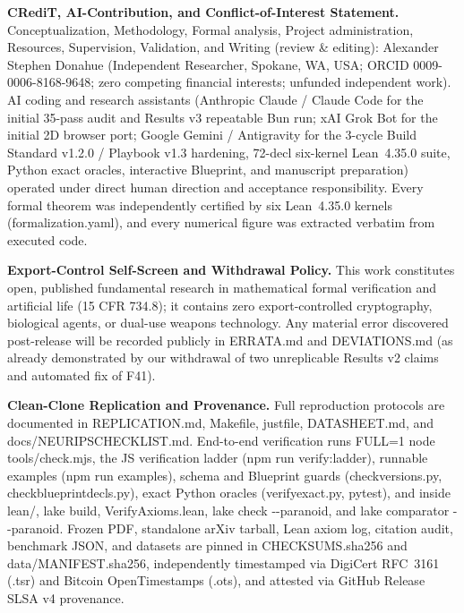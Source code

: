 \documentclass[11pt,a4paper]{article}
\numberwithin{equation}{section}
\theoremstyle{plain}
\theoremstyle{definition}
\theoremstyle{remark}
\newcommand{\code}[1]{{\ttfamily\footnotesize\def\_{\textunderscore\penalty0\hskip0pt}#1}}
\begin{document}
\textbf{CRediT, AI-Contribution, and Conflict-of-Interest Statement.} Conceptualization, Methodology, Formal analysis, Project administration, Resources, Supervision, Validation, and Writing (review \& editing): Alexander Stephen Donahue (Independent Researcher, Spokane, WA, USA; ORCID \code{0009-0006-8168-9648}; zero competing financial interests; unfunded independent work). AI coding and research assistants (Anthropic Claude / Claude Code for the initial 35-pass audit and \code{Results v3} repeatable Bun run; xAI Grok Bot for the initial 2D browser port; Google Gemini / Antigravity for the 3-cycle Build Standard \code{v1.2.0} / Playbook \code{v1.3} hardening, 72-decl six-kernel Lean~4.35.0 suite, Python exact oracles, interactive Blueprint, and manuscript preparation) operated under direct human direction and acceptance responsibility. Every formal theorem was independently certified by six Lean~4.35.0 kernels (\code{formalization.yaml}), and every numerical figure was extracted verbatim from executed code.

\textbf{Export-Control Self-Screen and Withdrawal Policy.} This work constitutes open, published fundamental research in mathematical formal verification and artificial life (\code{15 CFR 734.8}); it contains zero export-controlled cryptography, biological agents, or dual-use weapons technology. Any material error discovered post-release will be recorded publicly in \code{ERRATA.md} and \code{DEVIATIONS.md} (as already demonstrated by our withdrawal of two unreplicable \code{Results v2} claims and automated fix of \code{F41}).

\textbf{Clean-Clone Replication and Provenance.} Full reproduction protocols are documented in \code{REPLICATION.md}, \code{Makefile}, \code{justfile}, \code{DATASHEET.md}, and \code{docs/\allowbreak NEURIPS\_CHECKLIST.md}. End-to-end verification runs \code{FULL=1} \code{node} \code{tools/\allowbreak check.mjs}, the JS verification ladder (\code{npm} \code{run} \code{verify:\allowbreak ladder}), runnable examples (\code{npm} \code{run} \code{examples}), schema and Blueprint guards (\code{check\_versions.py}, \code{check\_blueprint\_decls.py}), exact Python oracles (\code{verify\_exact.py}, \code{pytest}), and inside \code{lean/}, \code{lake} \code{build}, \code{VerifyAxioms.\allowbreak lean}, \code{lake} \code{check} \code{{-}{-}paranoid}, and \code{lake} \code{comparator} \code{{-}{-}paranoid}. Frozen PDF, standalone arXiv tarball, Lean axiom log, citation audit, benchmark JSON, and datasets are pinned in \code{CHECKSUMS.\allowbreak sha256} and \code{data/\allowbreak MANIFEST.\allowbreak sha256}, independently timestamped via DigiCert RFC~3161 (\code{.tsr}) and Bitcoin OpenTimestamps (\code{.ots}), and attested via GitHub Release SLSA v4 provenance.



\end{document}
